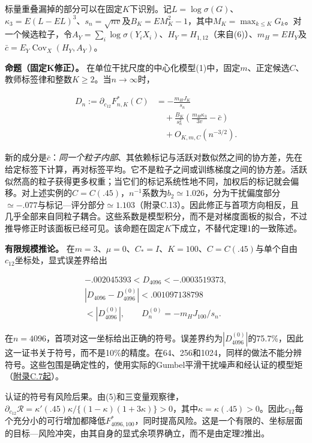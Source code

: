 \documentclass[11pt,a4paper]{article}
\begin{document}
标量重叠漏掉的部分可以在固定\(K\)下识别。记\(L=\log\sigma(G)\)、\(\kappa_3=E(L-EL)^3\)、\(s_n=\sqrt{nv}\)及\(B_K=EM_K^2-1\)，其中\(M_K=\max_{k\le K}G_k\)。对一个候选粒子，令\(A_Y=\sum_i\log\sigma(Y_iX_i)\)、\(H_Y=H_{1,12}\)（来自(6)）、\(m_H=EH_Y\)及\(\bar c=E_Y\operatorname{Cov}_X(H_Y,A_Y)\)。

\protect{}\label{fixed-k-proposition}
\textbf{命题（固定K修正）。}
在单位干扰尺度的中心化模型(1)中，固定\(m\)、正定候选\(C\)、教师标签律和整数\(K\ge2\)。当\(n\to\infty\)时，

\[
\begin{aligned}
D_n:=\partial_{c_{12}}F_{n,K}^*(C)
&=-\frac{m_HJ_K}{s_n}\\
&\quad+\frac{B_K}{s_n^2}
 \left(\frac{m_H\kappa_3}{3v}-\bar c\right)\\
&\quad+O_{K,m,C}(n^{-3/2}).
\end{aligned}
\tag{11}
\]

新的成分是\(\bar c\)：\emph{同一个粒子内部}、其依赖标记与活跃对数似然之间的协方差，先在给定标签下计算，再对标签平均。它不是粒子之间或训练梯度之间的协方差。活跃似然高的粒子获得更多权重；当它们的标记系统性地不同，加权后的标记就会偏移。对上述实例的\(C=C(.45)\)，\(n^{-1}\)系数为\(b_2\simeq1.026\)，分为干扰偏度部分\(\simeq-.077\)与标记---评分部分\(\simeq1.103\)（附录C.13）。因此修正与首项方向相反，且几乎全部来自同粒子耦合。这些系数是模型积分，而不是对梯度面板的拟合，不过推导修正时该面板已经可见。该命题在固定\(K\)下成立，不替代定理1的一致陈述。

\protect{}\label{finite-direction-corollary}
\textbf{有限规模推论。}
在\(m=3\)、\(\mu=0\)、\(C_*=I\)、\(K=100\)、\(C=C(.45)\)与单个自由\(c_{12}\)坐标处，显式误差界给出

\[
\begin{gathered}
-.002045393<D_{4096}<-.0003519373,\\
|D_{4096}-D_{4096}^{(0)}|<.001097138798\\
<|D_{4096}^{(0)}|,\qquad
D_n^{(0)}=-m_HJ_{100}/s_n.
\end{gathered}
\tag{12}
\]

在\(n=4096\)，首项对这一坐标给出正确的符号。误差界约为\(|D_{4096}^{(0)}|\)的75.7\%，因此这一证书关于符号，而不是10\%的精度。在64、256和1024，同样的做法不能分辨符号。这些包围是确定性的，使用实际的Gumbel平滑干扰噪声和经认证的模型矩（\hyperref[fixed-k-correction]{附录C.7起}）。

认证的符号有风险后果。由(5)和三变量观察律，\(\partial_{c_{12}}\mathcal R=\kappa'(.45)\kappa/\{(1-\kappa)(1+3\kappa)\}>0\)，其中\(\kappa=\kappa(.45)>0\)。因此\(c_{12}\)每个充分小的可行增加都降低\(F^*_{4096,100}\)，同时提高风险。这是一个有限的、坐标层面的目标---风险冲突，由其自身的显式余项界确立，而不是由定理2推出。
\end{document}
